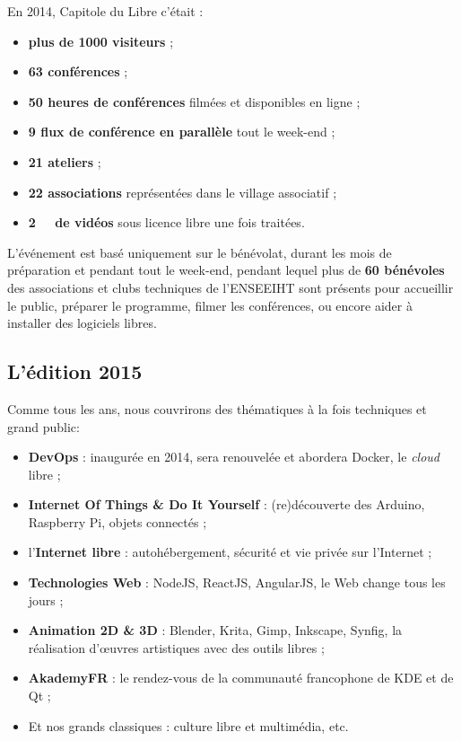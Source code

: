 \begin{minipage}{0.6\textwidth}
En 2014, Capitole du Libre c'était :
\begin{itemize}[label=$\bullet$]
\item \textbf{plus de 1000 visiteurs} ;
\item \textbf{63 conférences} ;
\item \textbf{50 heures de conférences} filmées et disponibles en ligne ;
\item \textbf{9 flux de conférence en parallèle} tout le week-end ;
\item \textbf{21 ateliers} ;
\item \textbf{22 associations} représentées dans le village associatif ;
\item \textbf{\SI{2}{\tebi\byte} de vidéos} sous licence libre une fois traitées.
\end{itemize}
\end{minipage}
\begin{minipage}{0.4\textwidth}
\begin{center}
\end{center}
\end{minipage}

\Separateur

L'événement est basé uniquement sur le bénévolat, durant les mois 
de préparation et pendant tout le week-end, pendant lequel plus de \textbf{60 
bénévoles} des associations et clubs techniques de l'ENSEEIHT
sont présents pour accueillir le public, préparer le 
programme, filmer les conférences, ou encore aider à installer des 
logiciels libres.

\subsection{L'édition 2015}

Comme tous les ans, nous couvrirons des thématiques à la fois techniques et grand 
public:

\begin{itemize}[label=$\bullet$]
\item \textbf{DevOps} : inaugurée en 2014, sera renouvelée et abordera Docker, le \textit{cloud} libre ;
\item \textbf{Internet Of Things \& Do It Yourself} : (re)découverte des Arduino, Raspberry Pi, objets connectés ;
\item l’\textbf{Internet libre} : autohébergement, sécurité et vie privée sur l’Internet ;
\item \textbf{Technologies Web} : NodeJS, ReactJS, AngularJS, le Web change tous les jours ;
\item \textbf{Animation 2D \& 3D} : Blender, Krita, Gimp, Inkscape, Synfig, la réalisation d'œuvres artistiques avec des outils libres ;

\item \textbf{AkademyFR} : le rendez-vous de la communauté francophone de KDE et de Qt ;
\item Et nos grands classiques : culture libre et multimédia, etc.
\end{itemize}

